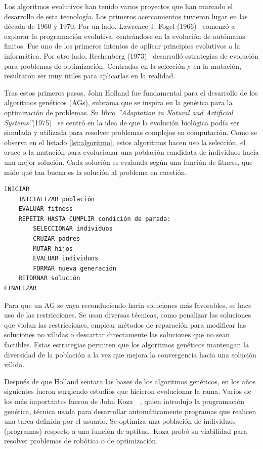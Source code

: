 Los algoritmos evolutivos han tenido varios proyectos que han marcado el desarrollo de esta tecnología. Los primeros acercamientos tuvieron lugar en las década de 1960 y 1970. Por un lado, Lawrence J. Fogel (1966)~\cite{fogel1966} comenzó a explorar la programación evolutiva, centrándose en la evolución de autómatas finitos. Fue uno de los primeros intentos de aplicar principios evolutivos a la informática. Por otro lado, Rechenberg (1973)~\cite{rechenberg1973} desarrolló estrategias de evolución para problemas de optimización. Centradas en la selección y en la mutación, resultaron ser muy útiles para aplicarlas en la realidad.

Tras estos primeros pasos, John Holland fue fundamental para el desarrollo de los algoritmos genéticos (AGs), subrama que se inspira en la genética para la optimización de problemas. Su libro \textit{''Adaptation in Natural and Artificial Systems''}(1975)~\cite{holland1975} se centró en la idea de que la evolución biológica podía ser simulada y utilizada para resolver problemas complejos en computación. Como se observa en el listado \ref{lst:algoritmo}, estos algoritmos hacen uso la selección, el cruce o la mutación para evolucionar una población candidata de individuos hacia una mejor solución. Cada solución es evaluada según una función de fitness, que mide qué tan buena es la solución al problema en cuestión.

\begin{lstlisting}[caption=Algoritmo evolutivo., label={lst:algoritmo}]
INICIAR
    INICIALIZAR población
    EVALUAR fitness
    REPETIR HASTA CUMPLIR condición de parada:
        SELECCIONAR individuos
        CRUZAR padres
        MUTAR hijos
        EVALUAR individuos
        FORMAR nueva generación
    RETORNAR solución
FINALIZAR
\end{lstlisting}

Para que un AG se vaya reconduciendo hacia soluciones más favorables, se hace uso de las restricciones. Se usan diversas técnicas, como penalizar las soluciones que violan las restricciones, emplear métodos de reparación para modificar las soluciones no válidas o descartar directamente las soluciones que no sean factibles. Estas estrategias permiten que los algoritmos genéticos mantengan la diversidad de la población a la vez que mejora la convergencia hacia una solución válida.

Después de que Holland sentara las bases de los algoritmos genéticos, en los años siguientes fueron surgiendo estudios que hicieron evolucionar la rama. Varios de los más importantes fueron de John Koza~\cite{koza1992}~\cite{koza1994}, quien introdujo la programación genética, técnica usada para desarrollar automáticamente programas que realicen una tarea definida por el usuario. Se optimiza una población de individuos (programas) respecto a una función de aptitud. Koza probó su viabilidad para resolver problemas de robótica o de optimización.

